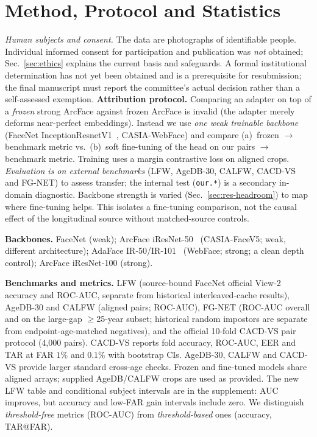 \documentclass[journal]{IEEEtran}
\begin{document}
\section{Method, Protocol and Statistics}\label{sec:method}
\emph{Human subjects and consent.} The data are photographs of identifiable people. Individual informed consent for participation and publication was \emph{not} obtained; Sec.~\ref{sec:ethics} explains the current basis and safeguards. A formal institutional determination has not yet been obtained and is a prerequisite for resubmission; the final manuscript must report the committee's actual decision rather than a self-assessed exemption.
\textbf{Attribution protocol.} Comparing an adapter on top of a \emph{frozen} strong ArcFace against frozen ArcFace is invalid (the adapter merely deforms near-perfect embeddings). Instead we use \emph{one weak trainable backbone} (FaceNet InceptionResnetV1~\cite{schroff2015facenet}, CASIA-WebFace) and compare (a)~frozen $\rightarrow$ benchmark metric vs.\ (b)~soft fine-tuning of the head on our pairs $\rightarrow$ benchmark metric. Training uses a margin contrastive loss on aligned crops. \emph{Evaluation is on external benchmarks} (LFW, AgeDB-30, CALFW, CACD-VS and FG-NET) to assess transfer; the internal test (\texttt{our.*}) is a secondary in-domain diagnostic. Backbone strength is varied (Sec.~\ref{sec:res-headroom}) to map where fine-tuning helps. This isolates a fine-tuning comparison, not the causal effect of the longitudinal source without matched-source controls.

\textbf{Backbones.} FaceNet (weak); ArcFace iResNet-50~\cite{deng2019arcface} (CASIA-FaceV5; weak, different architecture); AdaFace IR-50/IR-101~\cite{kim2022adaface} (WebFace; strong; a clean depth control); ArcFace iResNet-100 (strong).

\textbf{Benchmarks and metrics.} LFW (source-bound FaceNet official View-2 accuracy and ROC-AUC, separate from historical interleaved-cache results), AgeDB-30 and CALFW (aligned pairs; ROC-AUC), FG-NET (ROC-AUC overall and on the large-gap $\geq$25-year subset; historical random impostors are separate from endpoint-age-matched negatives), and the official 10-fold CACD-VS pair protocol (4{,}000 pairs). CACD-VS reports fold accuracy, ROC-AUC, EER and TAR at FAR $1\%$ and $0.1\%$ with bootstrap CIs. AgeDB-30, CALFW and CACD-VS provide larger standard cross-age checks. Frozen and fine-tuned models share aligned arrays; supplied AgeDB/CALFW crops are used as provided. The new LFW table and conditional subject intervals are in the supplement: AUC improves, but accuracy and low-FAR gain intervals include zero. We distinguish \emph{threshold-free} metrics (ROC-AUC) from \emph{threshold-based} ones (accuracy, TAR@FAR).
\end{document}
